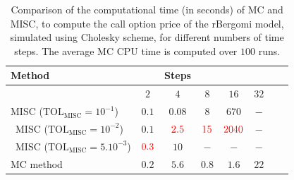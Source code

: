 \documentclass[11pt]{article}
\begin{document}
\begin{table}[htbp]
	\centering
	\begin{tabular}{l*{6}{c}r}
		\toprule[1.5pt]
	Method & & Steps  & &  &    \\
	\hline
	        & $2$ & $4$ & $8$  &$16$  &$32$ \\
		\hline
		MISC ($\text{TOL}_{\text{MISC}}=10^{-1}$)  & $0.1$ & $0.08$ & $8$  & $670$  &  $-$\\\
		MISC ($\text{TOL}_{\text{MISC}}=10^{-2}$)  & $0.1$ & ${\color{red}2.5}$ & ${\color{red}15}$ &  ${\color{red}2040}$ &  $-$\\\
				MISC ($\text{TOL}_{\text{MISC}}=5.10^{-3}$)  & ${\color{red}0.3}$& $10$ & $-$ &  $-$ &  $-$\\
		\hline	
		MC method & $0.2$  & $5.6$  & $0.8$ & $1.6$  & $22$\\
		\bottomrule[1.25pt]	
		\hline
	\end{tabular}
	\caption{Comparison of the computational time (in seconds) of  MC and MISC, to compute the call option price of the rBergomi model, simulated using Cholesky scheme, for different numbers of time steps. The average MC CPU time is computed over $100$ runs.}
	\label{Comparsion of the computational time of  MC and MISC, used to compute Call option price of rBergomi model_cholesky for different number of time steps. Case $K=1, H=0.07$, linear}
\end{table}
\FloatBarrier



 







 

 

 
 
 
\end{document}
